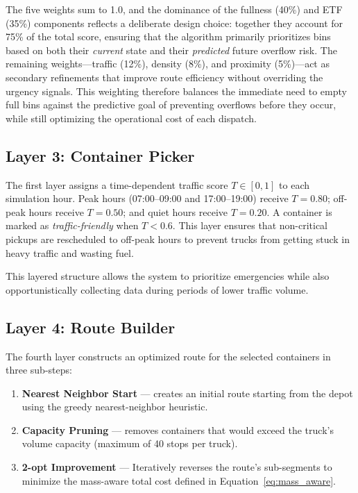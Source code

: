 \documentclass[12pt,a4paper]{report}
\begin{document}
\indent The five weights sum to 1.0, and the dominance of the fullness (40\%) and ETF (35\%) components reflects a deliberate design choice: together they account for 75\% of the total score, ensuring that the algorithm primarily prioritizes bins based on both their \textit{current} state and their \textit{predicted} future overflow risk. The remaining weights---traffic (12\%), density (8\%), and proximity (5\%)---act as secondary refinements that improve route efficiency without overriding the urgency signals. This weighting therefore balances the immediate need to empty full bins against the predictive goal of preventing overflows before they occur, while still optimizing the operational cost of each dispatch.

\subsection{Layer 3: Container Picker}

The first layer assigns a time-dependent traffic score $T \in [0, 1]$ to each simulation hour. Peak hours (07:00–09:00 and 17:00–19:00) receive $T = 0.80$; off-peak hours receive $T = 0.50$; and quiet hours receive $T = 0.20$. A container is marked as \textit{traffic-friendly} when $T < 0.6$. This layer ensures that non-critical pickups are rescheduled to off-peak hours to prevent trucks from getting stuck in heavy traffic and wasting fuel.

\indent This layered structure allows the system to prioritize emergencies while also opportunistically collecting data during periods of lower traffic volume.

\subsection{Layer 4: Route Builder}

\indent The fourth layer constructs an optimized route for the selected containers in three sub-steps:
\begin{enumerate}[leftmargin=2cm]
  \item \textbf{Nearest Neighbor Start} --- creates an initial route starting from the depot using the greedy nearest-neighbor heuristic.
  \item \textbf{Capacity Pruning} --- removes containers that would exceed the truck’s volume capacity (maximum of 40 stops per truck).
  \item \textbf{2-opt Improvement} --- Iteratively reverses the route’s sub-segments to minimize the mass-aware total cost defined in Equation~\ref{eq:mass_aware}.
\end{enumerate}
\end{document}
